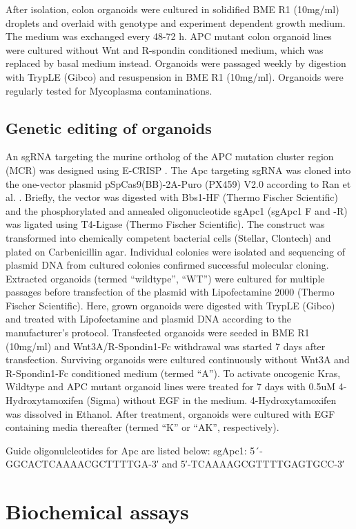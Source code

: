 \begin{flushleft}
After isolation, colon organoids were cultured in solidified BME R1 (10mg/ml) droplets and overlaid with genotype and experiment dependent growth medium. The medium was exchanged every 48-72 h. 
APC mutant colon organoid lines were cultured without Wnt and R-spondin conditioned medium, which was replaced by basal medium instead.
Organoids were passaged weekly by digestion with TrypLE (Gibco) and resuspension in BME R1 (10mg/ml). 
Organoids were regularly tested for Mycoplasma contaminations.  

\subsection{Genetic editing of organoids}
An sgRNA targeting the murine ortholog of the APC mutation cluster region (MCR) was designed using E-CRISP \cite{Heigwer2014-gq}. The Apc targeting sgRNA was cloned into the one-vector plasmid pSpCas9(BB)-2A-Puro (PX459) V2.0 according to Ran et al. \cite{Ran2013-ca}. Briefly, the vector was digested with Bbs1-HF (Thermo Fischer Scientific) and the phosphorylated and annealed oligonucleotide sgApc1 (sgApc1 F and -R) was ligated using T4-Ligase (Thermo Fischer Scientific). The construct was transformed into chemically competent bacterial cells (Stellar, Clontech) and plated on Carbenicillin agar. Individual colonies were isolated and sequencing of plasmid DNA from cultured colonies confirmed successful molecular cloning.   
Extracted organoids (termed “wildtype”, “WT”) were cultured for multiple passages before transfection of the plasmid with Lipofectamine 2000 (Thermo Fischer Scientific). Here, grown organoids were digested with TrypLE (Gibco) and treated with Lipofectamine and plasmid DNA according to the manufacturer’s protocol. Transfected organoids were seeded in BME R1 (10mg/ml) and Wnt3A/R-Spondin1-Fc withdrawal was started 7 days after transfection. Surviving organoids were cultured continuously without Wnt3A and R-Spondin1-Fc conditioned medium (termed “A”).
To activate oncogenic Kras, Wildtype and APC mutant organoid lines were treated for 7 days with 0.5uM 4-Hydroxytamoxifen (Sigma) without EGF in the medium. 4-Hydroxytamoxifen was dissolved in Ethanol. After treatment, organoids were cultured with EGF containing media thereafter (termed “K” or “AK”, respectively).

\smallbreak
Guide oligonulcleotides for Apc are listed below:
sgApc1: 5´-GGCACTCAAAACGCTTTTGA-3′ and 5′-TCAAAAGCGTTTTGAGTGCC-3′ 

\section{Biochemical assays}


\end{flushleft}
